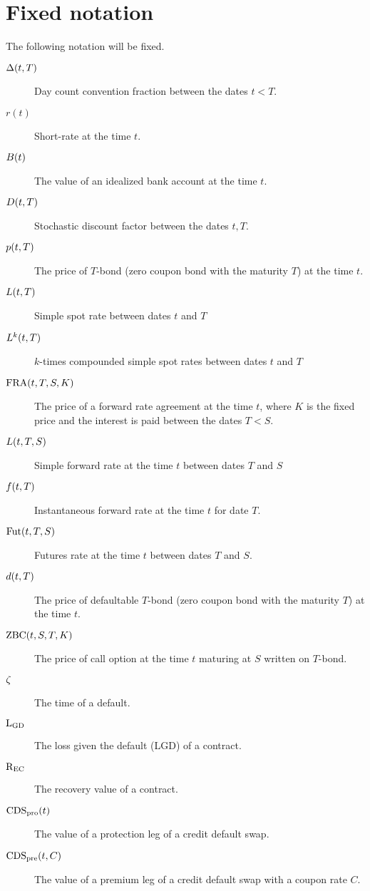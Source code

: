 \section{Fixed notation}

The following notation will be fixed.

\begin{description}
	\item[$\Delta(t,T)$] Day count convention fraction between the dates $t < T$.
	\item[$r(t)$] Short-rate at the time $t$.
	\item[$B(t)$] The value of an idealized bank account at the time $t$.
	\item[$D (t,T)$] Stochastic discount factor between the dates $t,T$.
	\item[$p(t,T)$] The price of $T$-bond (zero coupon bond with the maturity $T$) at the time $t$.
	\item[$L(t,T)$] Simple spot rate between dates $t$ and $T$
	\item[$L^k(t,T)$] $k$-times compounded simple spot rates between dates $t$ and $T$
	\item[$\operatorname{\mathrm{FRA}}(t,T,S,K)$] The price of a forward rate agreement at the time $t$, where $K$ is the fixed price and the interest is paid between the dates $T < S$.
	\item[$L(t,T,S)$] Simple forward rate at the time $t$ between dates $T$ and $S$
	\item[$f(t,T)$] Instantaneous forward rate at the time $t$ for date $T$.
	\item[$\operatorname{\mathrm{Fut}}(t,T,S)$] Futures rate at the time $t$ between dates $T$ and $S$.
	\item[$d(t,T)$] The price of defaultable $T$-bond (zero coupon bond with the maturity $T$) at the time $t$.
	\item[$\operatorname{\mathrm{ZBC}}(t,S,T,K)$] The price of call option at the time $t$ maturing at $S$ written on $T$-bond. 
	\item[$\zeta$] The time of a default.
	\item[$\mathrm{L_{GD}}$] The loss given the default (LGD) of a contract.
	\item[$\mathrm{R_{EC}}$] The recovery value of a contract.
	\item[$\operatorname{\mathrm{CDS_{pro}}}(t)$] The value of a protection leg of a credit default swap.
	\item[$\operatorname{\mathrm{CDS_{pre}}}(t,C)$] The value of a premium leg of a credit default swap with a coupon rate $C$.
\end{description}